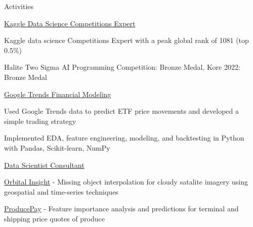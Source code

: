 \documentclass{resume} %
\begin{document}
\begin{rSection}{Activities}

\begin{rSubsection}{\href{https://www.kaggle.com/evilpegasus}{Kaggle Data Science Competitions Expert}}{}{}{}
    \item Kaggle data science Competitions Expert with a peak global rank of 1081 (top 0.5\%)
    \item Halite Two Sigma AI Programming Competition: Bronze Medal, Kore 2022: Bronze Medal
\end{rSubsection}

\begin{rSubsection}{\href{https://github.com/evilpegasus/google-trends-financial-modeling/}{Google Trends Financial Modeling}}{}{}{}
    \item Used Google Trends data to predict ETF price movements and developed a simple trading strategy
    \item Implemented EDA, feature engineering, modeling, and backtesting in Python with Pandas, Scikit-learn, NumPy
\end{rSubsection}

\begin{rSubsection}{\href{https://www.producepay.com/}{Data Scientist Consultant}}{}{}{}
    \item \href{https://orbitalinsight.com/}{Orbital Insight} - Missing object interpolation for cloudy satalite imagery using geospatial and time-series techniques
    \item \href{https://producepay.com/}{ProducePay} - Feature importance analysis and predictions for terminal and shipping price quotes of produce
\end{rSubsection}




\end{rSection}
\end{document}

